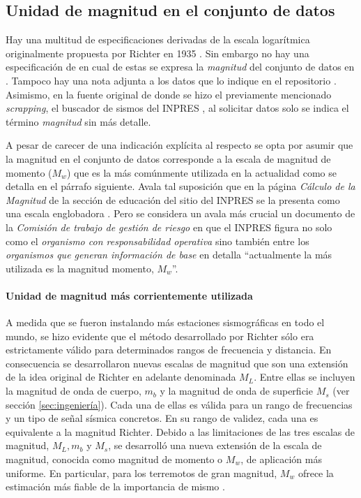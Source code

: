 \documentclass[a4paper]{report}
\begin{document}
\subsection{Unidad de magnitud en el conjunto de datos}\label{sec:magnitud}
Hay una multitud de especificaciones derivadas de la escala logarítmica originalmente propuesta por Richter en 1935 \cite[sección 4.2.3]{fowler_solid_1990}.
Sin embargo no hay una especificación de en cual de estas se expresa la \emph{magnitud} del conjunto de datos en \cite{daniela_parada_ic-datasets-docencia_nodate}.
Tampoco hay una nota adjunta a los datos que lo indique en el repositorio \cite{daniela_parada_sismos-arg_nodate}. 
Asimismo, en la fuente original de donde se hizo el previamente mencionado \emph{scrapping}, el buscador de sismos del INPRES \cite{noauthor_buscador_nodate}, al solicitar datos solo se indica el término \emph{magnitud} sin más detalle.

A pesar de carecer de una indicación explícita al respecto se opta por asumir que la magnitud en el conjunto de datos corresponde a la escala de magnitud de momento (\(M_w\)) que es la más comúnmente utilizada en la actualidad como se detalla en el párrafo siguiente.
Avala tal suposición que en la página \emph{Cálculo de la Magnitud} de la sección de educación del sitio del INPRES se la presenta como una escala englobadora \cite{noauthor_calculo_2022}.
Pero se considera un avala más crucial un documento de la \emph{Comisión de trabajo de gestión de riesgo} en que el INPRES figura no solo como el \emph{organismo con responsabilidad operativa} sino también entre los \emph{organismos que generan información de base} en \cite[anéxo X]{noauthor_sismos_2015} detalla ``actualmente la más utilizada es la magnitud momento, \(M_w\)''.  


\paragraph{Unidad de magnitud más corrientemente utilizada}
A medida que se fueron instalando más estaciones sismográficas en todo el mundo, se hizo evidente que el método desarrollado por Richter sólo era estrictamente válido para determinados rangos de frecuencia y distancia.
En consecuencia se desarrollaron nuevas escalas de magnitud que son una extensión de la idea original de Richter en adelante denominada \(M_L\).
Entre ellas se incluyen la magnitud de onda de cuerpo, \(m_b\) y la magnitud de onda de superficie \(M_s\) (ver sección \ref{sec:ingeniería}).
Cada una de ellas es válida para un rango de frecuencias y un tipo de señal sísmica concretos.
En su rango de validez, cada una es equivalente a la magnitud Richter.
Debido a las limitaciones de las tres escalas de magnitud, \(M_L, m_b\) y \(M_s\), se desarrolló una nueva extensión de la escala de magnitud, conocida como magnitud de momento o \(M_w\), de aplicación más uniforme.
En particular, para los terremotos de gran magnitud, \(M_w\) ofrece la estimación más fiable de la importancia de mismo \cite{noauthor_moment_nodate}.
	
\end{document}
